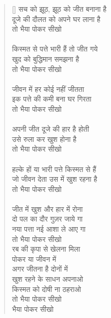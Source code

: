 \begin{verse}[\versewidth]\texthindi{
सच को झूठ, झूठ को जीत बनाना है\\
दूजे की दौलत को अपने घर लाना है\\
तो भैया पोकर सीखो\\
\\
किस्मत से पत्ते भारी हैं तो जीत गये\\
खुद को बुद्धिमान समझना है\\
तो भैया पोकर सीखो\\
\\
जीवन में हर कोई नहीं जीतता\\
इक पत्ते की कमी बना घर गिरता\\
तो भैया पोकर सीखो\\
\\
अपनी जीत दूजे की हार है होती\\
उसे रुला कर खुश होना है\\
तो भैया पोकर सीखो\\
\\
हल्के हों या भारी पत्ते किस्मत से हैं\\
जो जीवन देता उस में खुश रहना है\\
तो भैया पोकर सीखो\\
\\
जीत में खुश और हार में रोना\\
दो पल का दौर गुज़र जाये गा\\
नया पत्ता नई आशा ले आए गा\\
तो भैया पोकर सीखो\\
रब की कृपा से खेलना मिला\\
पोकर या जीवन में\\
अगर जीतना है दोनों में\\
खुश रहने के साधन अपनाओ\\
किस्मत को दोषी ना ठहराओ\\
तो भैया पोकर सीखो\\
भैया पोकर सीखो
}\end{verse}

